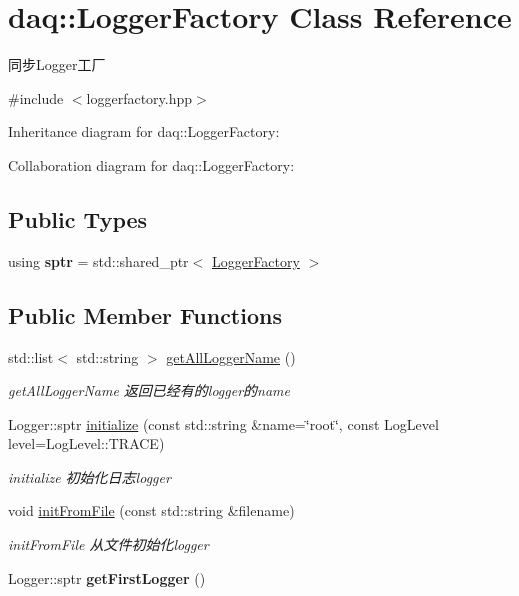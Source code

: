 \hypertarget{classdaq_1_1LoggerFactory}{}\section{daq\+:\+:Logger\+Factory Class Reference}
\label{classdaq_1_1LoggerFactory}


同步\+Logger工厂  




{\ttfamily \#include $<$loggerfactory.\+hpp$>$}



Inheritance diagram for daq\+:\+:Logger\+Factory\+:


Collaboration diagram for daq\+:\+:Logger\+Factory\+:
\subsection*{Public Types}
\begin{DoxyCompactItemize}
\item 
\mbox{\label{classdaq_1_1LoggerFactory_ad7320171ee45ecceecace4ce086b1eb1}} 
using {\bfseries sptr} = std\+::shared\+\_\+ptr$<$ \hyperlink{classdaq_1_1LoggerFactory}{Logger\+Factory} $>$
\end{DoxyCompactItemize}
\subsection*{Public Member Functions}
\begin{DoxyCompactItemize}
\item 
std\+::list$<$ std\+::string $>$ \hyperlink{classdaq_1_1LoggerFactory_a5e4c7a7700337417663dac8ffeb584ae}{get\+All\+Logger\+Name} ()
\begin{DoxyCompactList}\small\item\em get\+All\+Logger\+Name 返回已经有的logger的name \end{DoxyCompactList}\item 
Logger\+::sptr \hyperlink{classdaq_1_1LoggerFactory_ad417ef89981205a406dd4fa29e3b4c7a}{initialize} (const std\+::string \&name=\char`\"{}root\char`\"{}, const Log\+Level level=Log\+Level\+::\+T\+R\+A\+CE)
\begin{DoxyCompactList}\small\item\em initialize 初始化日志logger \end{DoxyCompactList}\item 
void \hyperlink{classdaq_1_1LoggerFactory_a1286f3c2d1f58ba2ac2ecc19150b8ae1}{init\+From\+File} (const std\+::string \&filename)
\begin{DoxyCompactList}\small\item\em init\+From\+File 从文件初始化logger \end{DoxyCompactList}\item 
\mbox{\label{classdaq_1_1LoggerFactory_ae59e7c1b14d99b023b54974d61050956}} 
Logger\+::sptr {\bfseries get\+First\+Logger} ()
\end{DoxyCompactItemize}

